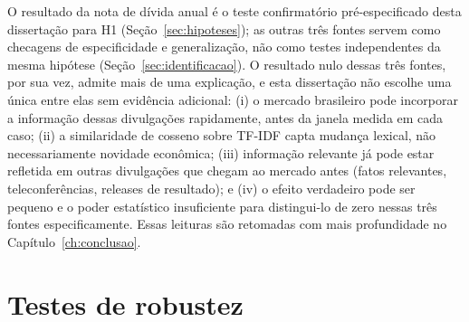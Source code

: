 \documentclass[a4paper,12pt]{report}
\begin{document}
O resultado da nota de dívida anual é o teste confirmatório pré-especificado desta dissertação para H1 (Seção~\ref{sec:hipoteses}); as outras três fontes servem como checagens de especificidade e generalização, não como testes independentes da mesma hipótese (Seção~\ref{sec:identificacao}). O resultado nulo dessas três fontes, por sua vez, admite mais de uma explicação, e esta dissertação não escolhe uma única entre elas sem evidência adicional: (i) o mercado brasileiro pode incorporar a informação dessas divulgações rapidamente, antes da janela medida em cada caso; (ii) a similaridade de cosseno sobre TF-IDF capta mudança lexical, não necessariamente novidade econômica; (iii) informação relevante já pode estar refletida em outras divulgações que chegam ao mercado antes (fatos relevantes, teleconferências, releases de resultado); e (iv) o efeito verdadeiro pode ser pequeno e o poder estatístico insuficiente para distingui-lo de zero nessas três fontes especificamente. Essas leituras são retomadas com mais profundidade no Capítulo~\ref{ch:conclusao}.

\FloatBarrier
\section{Testes de robustez}
\label{sec:robustez}
\end{document}
